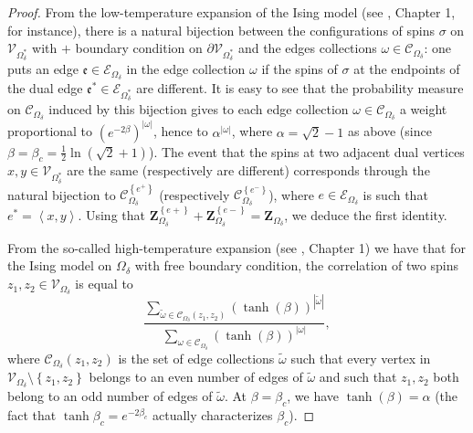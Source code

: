 \documentclass[oneside,english]{amsart}
\numberwithin{equation}{section}
\numberwithin{figure}{section}
\theoremstyle{plain}
\theoremstyle{plain}
\theoremstyle{plain}
\theoremstyle{plain}
\theoremstyle{plain}
\theoremstyle{definition}
\theoremstyle{remark}
\begin{document}
\begin{proof}
From the low-temperature expansion of the Ising model (see \cite{palmer},
Chapter 1, for instance), there is a natural bijection between the
configurations of spins $\sigma$ on $\mathcal{V}_{\Omega_{\delta}^{*}}$
with $+$ boundary condition on $\partial\mathcal{V}_{\Omega_{\delta}^{*}}$
and the edges collections $\omega\in\mathcal{C}_{\Omega_{\delta}}$:
one puts an edge $\mathfrak{e}\in\mathcal{E}_{\Omega_{\delta}}$ in
the edge collection $\omega$ if the spins of $\sigma$ at the endpoints
of the dual edge $\mathfrak{e}^{*}\in\mathcal{E}_{\Omega_{\delta}^{*}}$
are different. It is easy to see that the probability measure on $\mathcal{C}_{\Omega_{\delta}}$
induced by this bijection gives to each edge collection $\omega\in\mathcal{C}_{\Omega_{\delta}}$
a weight proportional to $\left(e^{-2\beta}\right)^{\left|\omega\right|}$,
hence to $\alpha^{\left|\omega\right|}$, where $\alpha=\sqrt{2}-1$
as above (since $\beta=\beta_{c}=\frac{1}{2}\ln\left(\sqrt{2}+1\right)$).
The event that the spins at two adjacent dual vertices $x,y\in\mathcal{V}_{\Omega_{\delta}^{*}}$
are the same (respectively are different) corresponds through the
natural bijection to $\mathcal{C}_{\Omega_{\delta}}^{\left\{ e^{+}\right\} }$
(respectively $\mathcal{C}_{\Omega_{\delta}}^{\left\{ e^{-}\right\} }$),
where $e\in\mathcal{E}_{\Omega_{\delta}}$ is such that $e^{*}=\left\langle x,y\right\rangle $.
Using that $\mathbf{Z}_{\Omega_{\delta}}^{\left\{ e+\right\} }+\mathbf{Z}_{\Omega_{\delta}}^{\left\{ e-\right\} }=\mathbf{Z}_{\Omega_{\delta}}$,
we deduce the first identity.

From the so-called high-temperature expansion (see \cite{palmer},
Chapter 1) we have that for the Ising model on $\Omega_{\delta}$
with free boundary condition, the correlation of two spins $z_{1},z_{2}\in\mathcal{V}_{\Omega_{\delta}}$
is equal to 
\[
\frac{\sum_{\tilde{\omega}\in\mathcal{C}_{\Omega_{\delta}}\left(z_{1},z_{2}\right)}\left(\tanh\left(\beta\right)\right)^{\left|\tilde{\omega}\right|}}{\sum_{\omega\in\mathcal{C}_{\Omega_{\delta}}}\left(\tanh\left(\beta\right)\right)^{\left|\omega\right|}},
\]
where $\mathcal{C}_{\Omega_{\delta}}\left(z_{1},z_{2}\right)$ is
the set of edge collections $\tilde{\omega}$ such that every vertex
in $\mathcal{V}_{\Omega_{\delta}}\setminus\left\{ z_{1},z_{2}\right\} $
belongs to an even number of edges of $\tilde{\omega}$ and such that
$z_{1},z_{2}$ both belong to an odd number of edges of $\tilde{\omega}$.
At $\beta=\beta_{c}$, we have $\tanh\left(\beta\right)=\alpha$ (the
fact that $\tanh\beta_{c}=e^{-2\beta_{c}}$ actually characterizes
$\beta_{c}$). 


\end{proof}
\end{document}
